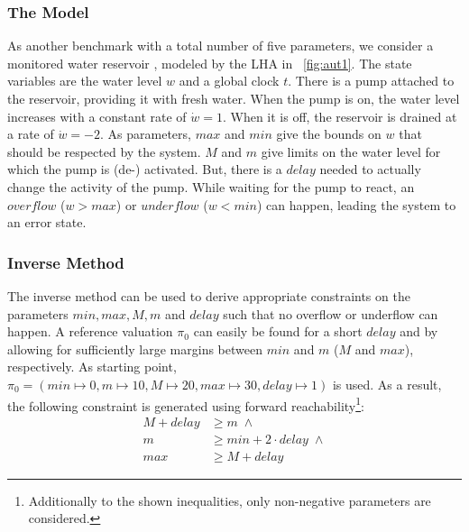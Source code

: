 \documentclass{llncs}
\begin{document}
\subsubsection{The Model} 
As another benchmark with a total number of five parameters, we consider
a monitored water reservoir \cite{HPR:97}, modeled by the LHA in
\figurename~\ref{fig:aut1}. The state variables are the water level $w$
and a global clock $t$. There is a pump attached to the reservoir,
providing it with fresh water. When the pump is on, the water level
increases with a constant rate of $\dot{w} = 1$. When it is off, the
reservoir is drained at a rate of $\dot{w} = -2$. As parameters, $max$
and $min$ give the bounds on $w$ that should be respected by the
system. $M$ and $m$ give limits on the water level for which the pump
is (de-) activated. But, there is a $delay$ needed to actually change
the activity of the pump. While waiting for the pump to react, an
$overflow$ ($w > max$) or $underflow$ ($w < min$) can happen, leading
the system to an error state.


\subsubsection{Inverse Method}
The inverse method can be used to derive appropriate constraints on
the parameters $min, max, M, m$ and $delay$ such that no overflow or
underflow can happen. A reference valuation $\pi_0$ can easily be
found for a short $delay$ and by allowing for sufficiently large
margins between $min$ and $m$ ($M$ and $max$), respectively. As
starting point, $\pi_0 = (min \mapsto 0, m \mapsto 10, M \mapsto 20,
max \mapsto 30, delay \mapsto 1)$ is used. As a result, the following
constraint is generated using forward
reachability\footnote{Additionally to the shown inequalities, only
  non-negative parameters are considered.}:
\begin{equation} \label{eq:tank_K0}
\begin{array}{rl}
  M + delay & \geq m \;\wedge\\
  m & \geq min + 2\cdot delay \;\wedge\\
  max & \geq M + delay
\end{array}
\end{equation}
\end{document}
